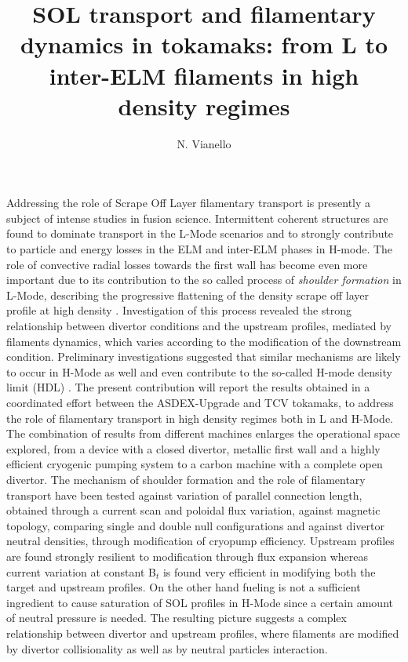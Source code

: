 \documentclass{epsconf}
\title{SOL transport and filamentary dynamics in tokamaks: from L to
  inter-ELM filaments in high density regimes}
\author{N. Vianello}
\institute{Consorzio RFX, C.so Stati Uniti 4, 35127, Padova, Italy}
\begin{document}
\maketitle
Addressing the role of Scrape Off Layer filamentary transport is
presently a subject of intense studies in fusion science. 
Intermittent coherent structures are found to dominate transport in
the L-Mode scenarios and to strongly contribute to particle
and energy losses in the ELM and inter-ELM phases in H-mode.
The role of convective radial losses towards the first
wall has become even more important due to its 
contribution 
to the so called process of \emph{shoulder formation} in
L-Mode, describing the progressive flattening of the density
scrape off layer profile at high density
\cite{LaBombard:2001ks,Carralero:2015gu,Militello:2016hk,Vianello:2017ku}.
Investigation of this process revealed the strong
relationship between divertor conditions and the upstream profiles,
mediated by filaments dynamics,  which varies
according to the modification of the downstream condition.
Preliminary investigations suggested that similar mechanisms are likely to
occur in H-Mode as well \cite{Carralero:2017gb} and even contribute to
the so-called H-mode density limit (HDL) \cite{bernert2014h}.  
The present contribution will report the results obtained in a
coordinated effort between the ASDEX-Upgrade and TCV tokamaks, to address
the role of filamentary transport in high density regimes both in L
and H-Mode. The combination 
of results from different machines enlarges the operational
space explored, from a device with a closed divertor, metallic
first wall and a highly efficient cryogenic pumping system to a carbon
machine with a complete open divertor.
The mechanism of shoulder formation and the role of filamentary
transport have been tested against variation of parallel connection
length, obtained through a current scan and poloidal flux variation,
against magnetic topology, comparing single and double null configurations
and against divertor neutral densities, through modification of
cryopump efficiency. Upstream profiles are found strongly resilient to
modification through flux expansion whereas current
variation at constant B$_t$ is found very efficient in
modifying  both the target and upstream profiles. On the other hand
fueling is not a sufficient ingredient to cause saturation of SOL
profiles in H-Mode since a certain amount of neutral pressure is
needed. 
The resulting picture suggests a complex
relationship between divertor and upstream profiles, where filaments
are modified by divertor collisionality as well as by neutral particles
interaction.

\begin{multicols}{2}%
\begingroup
{}
\printbibliography[heading=none]
\endgroup
\end{multicols}
\end{document}
